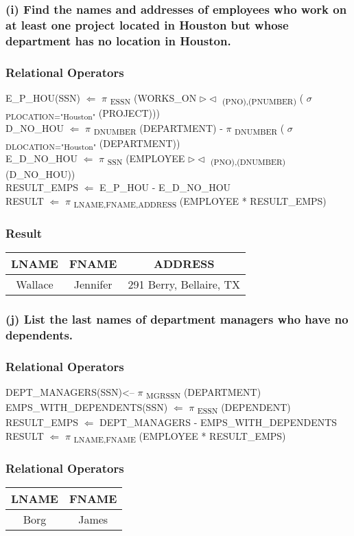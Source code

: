 \subsubsection*{(i) Find the names and addresses of employees who work on at least one project located in Houston but whose department has no location in Houston.}
\subsubsection*{Relational Operators}
E\_P\_HOU(SSN) $\Leftarrow$ $\pi$ \textsubscript{ESSN} (WORKS\_ON $\rhd\lhd$ \textsubscript{(PNO),(PNUMBER)} ( $\sigma$ \textsubscript{PLOCATION="Houston"} (PROJECT)))\\
D\_NO\_HOU $\Leftarrow$ $\pi$ \textsubscript{DNUMBER} (DEPARTMENT) - $\pi$ \textsubscript{DNUMBER} ( $\sigma$ \textsubscript{DLOCATION="Houston"} (DEPARTMENT))\\
E\_D\_NO\_HOU $\Leftarrow$ $\pi$ \textsubscript{SSN} (EMPLOYEE  $\rhd\lhd$ \textsubscript{(PNO),(DNUMBER)} (D\_NO\_HOU))\\
RESULT\_EMPS $\Leftarrow$ E\_P\_HOU - E\_D\_NO\_HOU \\
RESULT $\Leftarrow$ $\pi$ \textsubscript{LNAME,FNAME,ADDRESS} (EMPLOYEE * RESULT\_EMPS)

\subsubsection*{Result}
\begin{center}
\begin{tabular}{ c | c | c}
  LNAME & FNAME  & ADDRESS \\ \hline
  Wallace & Jennifer & 291 Berry, Bellaire, TX \\
\end{tabular}
\end{center}

\subsubsection*{(j) List the last names of department managers who have no dependents.}
\subsubsection*{Relational Operators}
DEPT\_MANAGERS(SSN)<-- $\pi$ \textsubscript{MGRSSN} (DEPARTMENT) \\
EMPS\_WITH\_DEPENDENTS(SSN) $\Leftarrow$ $\pi$ \textsubscript{ESSN} (DEPENDENT) \\
RESULT\_EMPS $\Leftarrow$ DEPT\_MANAGERS - EMPS\_WITH\_DEPENDENTS \\
RESULT $\Leftarrow$ $\pi$ \textsubscript{LNAME,FNAME} (EMPLOYEE * RESULT\_EMPS)

\subsubsection*{Relational Operators}
\begin{center}
\begin{tabular}{ c | c }
  LNAME & FNAME \\ \hline
  Borg & James \\
\end{tabular}
\end{center}